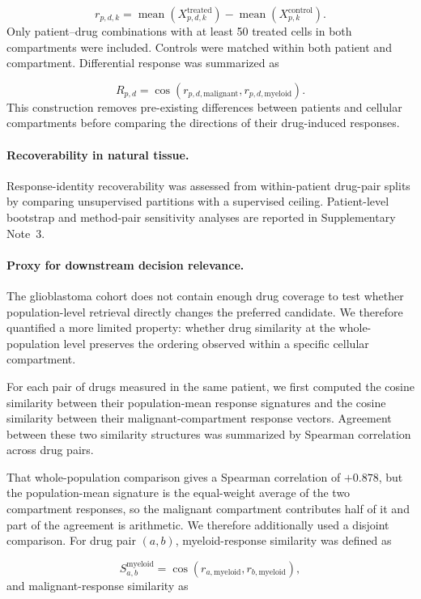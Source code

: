 \documentclass[11pt,letterpaper]{article}
\newcommand{\PREMISEOVERLAP}{+0.878}
\begin{document}
\[
r_{p,d,k}
=
\operatorname{mean}
\left(
X^{\mathrm{treated}}_{p,d,k}
\right)
-
\operatorname{mean}
\left(
X^{\mathrm{control}}_{p,k}
\right).
\]
Only patient--drug combinations with at least 50 treated cells in both compartments were included.
Controls were matched within both patient and compartment. Differential response was summarized as

\[
R_{p,d}
=
\cos
\left(
r_{p,d,\mathrm{malignant}},
r_{p,d,\mathrm{myeloid}}
\right).
\]
This construction removes pre-existing differences between patients and cellular compartments
before comparing the directions of their drug-induced responses.

\paragraph{Recoverability in natural tissue.}
Response-identity recoverability was assessed from within-patient drug-pair splits by comparing
unsupervised partitions with a supervised ceiling. Patient-level bootstrap and method-pair
sensitivity analyses are reported in Supplementary Note~3.

\paragraph{Proxy for downstream decision relevance.}
The glioblastoma cohort does not contain enough drug coverage to test whether population-level
retrieval directly changes the preferred candidate. We therefore quantified a more limited
property: whether drug similarity at the whole-population level preserves the ordering observed
within a specific cellular compartment.

For each pair of drugs measured in the same patient, we first computed the cosine similarity
between their population-mean response signatures and the cosine similarity between their
malignant-compartment response vectors. Agreement between these two similarity structures was
summarized by Spearman correlation across drug pairs.

That whole-population comparison gives a Spearman correlation of $\PREMISEOVERLAP$, but the
population-mean signature is the equal-weight average of the two compartment responses, so the
malignant compartment contributes half of it and part of the agreement is arithmetic. We therefore
additionally used a disjoint comparison. For drug pair
$(a,b)$, myeloid-response similarity was defined as

\[
S^{\mathrm{myeloid}}_{a,b}
=
\cos
\left(
r_{a,\mathrm{myeloid}},
r_{b,\mathrm{myeloid}}
\right),
\]
and malignant-response similarity as
\end{document}
